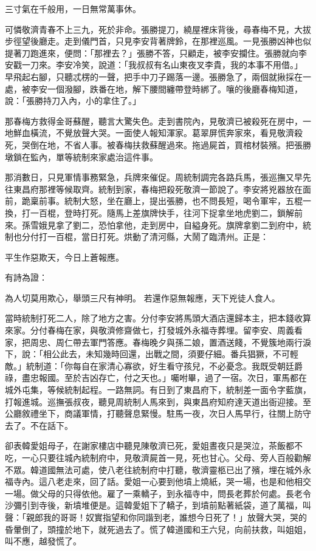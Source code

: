 三寸氣在千般用，一日無常萬事休。

可憐敬濟青春不上三九，死於非命。張勝提刀，繞屋裡床背後，尋春梅不見，大拔步徑望後廳走。走到儀門首，只見李安背著牌鈴，在那裡巡風。一見張勝凶神也似提著刀跑進來，便問：「那裡去？」張勝不答，只顧走，被李安攔住。張勝就向李安戳一刀來。李安冷笑，說道：「我叔叔有名山東夜叉李貴，我的本事不用借。」 早飛起右腳，只聽忒楞的一聲，把手中刀子踢落一邊。張勝急了，兩個就揪採在一處，被李安一個潑腳，跌番在地，解下腰間纏帶登時綁了。嚷的後廳春梅知道，說：「張勝持刀入內，小的拿住了。」

那春梅方救得金哥蘇醒，聽言大驚失色。走到書院內，見敬濟已被殺死在房中，一地鮮血橫流，不覺放聲大哭。一面使人報知渾家。葛翠屏慌奔家來，看見敬濟殺死，哭倒在地，不省人事。被春梅扶救蘇醒過來。拖過屍首，買棺材裝殯。把張勝墩鎖在監內，單等統制來家處治這件事。

那消數日，只見軍情事務緊急，兵牌來催促。周統制調完各路兵馬，張巡撫又早先往東昌府那裡等候取齊。統制到家，春梅把殺死敬濟一節說了。李安將兇器放在面前，跪稟前事。統制大怒，坐在廳上，提出張勝，也不問長短，喝令軍牢，五棍一換，打一百棍，登時打死。隨馬上差旗牌快手，往河下捉拿坐地虎劉二，鎖解前來。孫雪娥見拿了劉二，恐怕拿他，走到房中，自縊身死。旗牌拿劉二到府中，統制也分付打一百棍，當日打死。烘動了清河縣，大鬧了臨清州。正是：

平生作惡欺天，今日上蒼報應。

有詩為證：

為人切莫用欺心，舉頭三尺有神明。
若還作惡無報應，天下兇徒人食人。

當時統制打死二人，除了地方之害。分付李安將馬頭大酒店還歸本主，把本錢收算來家。分付春梅在家，與敬濟修齋做七，打發城外永福寺葬埋。留李安、周義看家，把周忠、周仁帶去軍門答應。春梅晚夕與孫二娘，置酒送餞，不覺簇地兩行淚下，說：「相公此去，未知幾時回還，出戰之間，須要仔細。番兵猖獗，不可輕敵。」統制道：「你每自在家清心寡欲，好生看守孩兒，不必憂念。我既受朝廷爵祿，盡忠報國。至於吉凶存亡，付之天也。」囑咐畢，過了一宿。次日，軍馬都在城外屯集，等候統制起程。一路無詞。有日到了東昌府下，統制差一面令字藍旗，打報進城。巡撫張叔夜，聽見周統制人馬來到，與東昌府知府達天道出衙迎接。至公廳敘禮坐下，商議軍情，打聽聲息緊慢。駐馬一夜，次日人馬早行，往關上防守去了。不在話下。

卻表韓愛姐母子，在謝家樓店中聽見陳敬濟已死，愛姐晝夜只是哭泣，茶飯都不吃，一心只要往城內統制府中，見敬濟屍首一見，死也甘心。父母、旁人百般勸解不眾。韓道國無法可處，使八老往統制府中打聽，敬濟靈柩已出了殯，埋在城外永福寺內。這八老走來，回了話。愛姐一心要到他墳上燒紙，哭一場，也是和他相交一場。做父母的只得依他。雇了一乘轎子，到永福寺中，問長老葬於何處。長老令沙彌引到寺後，新墳堆便是。這韓愛姐下了轎子，到墳前點著紙袋，道了萬福，叫聲：「親郎我的哥哥！奴實指望和你同諧到老，誰想今日死了！」放聲大哭，哭的昏暈倒了，頭撞於地下，就死過去了。慌了韓道國和王六兒，向前扶救，叫姐姐，叫不應，越發慌了。

